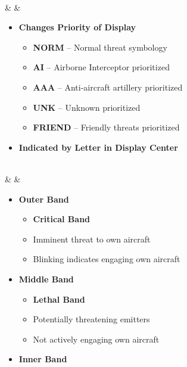 \documentclass[fontInter]{TechCheck}
\begin{document}
\begin{listlongtable}
\begin{minipage}[t]{\linewidth}
\begin{itemize}
			\end{itemize}
		\end{minipage} \\
		\midrule
		\textbf{\textbullet} &   &
		\begin{minipage}[t]{\linewidth}
			\vspace{-7pt}
			\begin{itemize}
				\item \textbf{Changes Priority of Display}
				\begin{itemize}
					\item \textbf{NORM} -- Normal threat symbology
					\item \textbf{AI} -- Airborne Interceptor prioritized
					\item \textbf{AAA} -- Anti-aircraft artillery prioritized
					\item \textbf{UNK} -- Unknown prioritized
					\item \textbf{FRIEND} -- Friendly threats prioritized
				\end{itemize}
				\item \textbf{Indicated by Letter in Display Center}
			\end{itemize}
		\end{minipage} \\
		\midrule
		\textbf{\textbullet} &  &
		\begin{minipage}[t]{\linewidth}
			\vspace{-7pt}
			\begin{itemize}
				\item \textbf{Outer Band}
				\begin{itemize}
					\item \textbf{Critical Band}
					\item Imminent threat to own aircraft
					\item Blinking indicates engaging own aircraft
				\end{itemize}
				\item \textbf{Middle Band}
				\begin{itemize}
					\item \textbf{Lethal Band}
					\item Potentially threatening emitters
					\item Not actively engaging own aircraft
				\end{itemize}
				\item \textbf{Inner Band}
				\begin{itemize}

\end{itemize}
\end{itemize}
\end{minipage}
\end{listlongtable}
\end{document}
